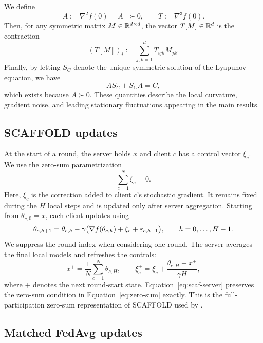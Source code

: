 We define
\begin{equation}
\label{eq:ATC}
A:=\nabla^2f(0)=A^{\top}\succ0,
\qquad T:=\nabla^3f(0).
\end{equation}
Then, for any symmetric matrix $M\in\mathbb{R}^{d\times d}$, the vector $T[M]\in\mathbb{R}^d$ is the contraction
\begin{equation}
\label{eq:tensor-contraction}
(T[M])_i:=\sum_{j,k=1}^{d}T_{ijk}M_{jk}.
\end{equation}
Finally, by letting $S_C$ denote the unique symmetric solution of the Lyapunov equation, we have
\begin{equation}
\label{eq:lyapunov}
AS_C+S_CA=C,
\end{equation}
which exists because $A\succ0$. These quantities describe the local curvature, gradient noise, and leading stationary fluctuations appearing in the main results.

\subsection{SCAFFOLD updates}

At the start of a round, the server holds $x$ and client $c$ has a control vector $\xi_c$. We use the zero-sum parametrization
\begin{equation}
\label{eq:zero-sum}
\sum_{c=1}^{N}\xi_c=0.
\end{equation}
Here, $\xi_c$ is the correction added to client $c$'s stochastic gradient. It remains fixed during the $H$ local steps and is updated only after server aggregation. Starting from $\theta_{c,0}=x$, each client updates using
\begin{equation}
\label{eq:scaf-local}
\theta_{c,h+1}=\theta_{c,h}
-\gamma\bigl(\nabla f(\theta_{c,h})+\xi_c+\varepsilon_{c,h+1}\bigr),
\qquad h=0,\ldots,H-1.
\end{equation}
We suppress the round index when considering one round. The server averages the final local models and refreshes the controls:
\begin{equation}
\label{eq:scaf-server}
x^+=\frac1N\sum_{c=1}^{N}\theta_{c,H},\qquad
\xi_c^+=\xi_c+\frac{\theta_{c,H}-x^+}{\gamma H},
\end{equation}
where $+$ denotes the next round-start state. Equation~\eqref{eq:scaf-server} preserves the zero-sum condition in Equation~\eqref{eq:zero-sum} exactly. This is the full-participation zero-sum representation of SCAFFOLD used by \citet{mangold2025scaffold}.

\subsection{Matched FedAvg updates}

